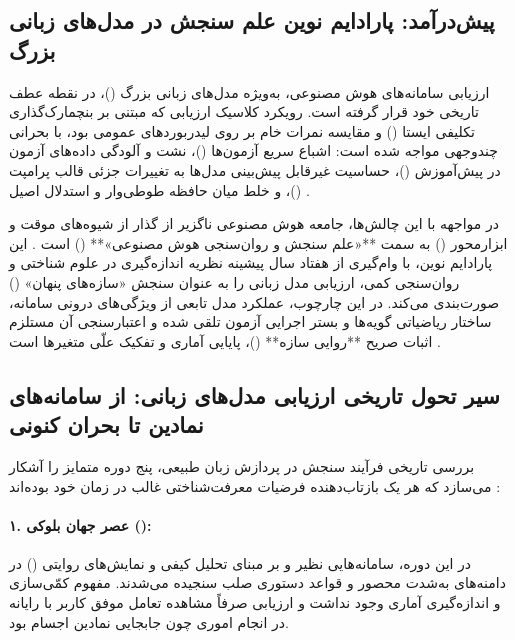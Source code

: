 \subsection*{پیش‌درآمد: پارادایم نوین علم سنجش در مدل‌های زبانی بزرگ}
ارزیابی سامانه‌های هوش مصنوعی، به‌ویژه مدل‌های زبانی بزرگ ()، در نقطه عطف تاریخی خود قرار گرفته است. رویکرد کلاسیک ارزیابی که مبتنی بر بنچمارک‌گذاری تکلیفی ایستا () و مقایسه نمرات خام بر روی لیدربوردهای عمومی بود، با بحرانی چندوجهی مواجه شده است: اشباع سریع آزمون‌ها ()، نشت و آلودگی داده‌های آزمون در پیش‌آموزش ()، حساسیت غیرقابل پیش‌بینی مدل‌ها به تغییرات جزئی قالب پرامپت ()، و خلط میان حافظه طوطی‌وار و استدلال اصیل \cite{bean2025measuring, uluirmak2026evalsafetygap, anonymous2026beyond}.

در مواجهه با این چالش‌ها، جامعه هوش مصنوعی ناگزیر از گذار از شیوه‌های موقت و ابزارمحور () به سمت **«علم سنجش و روان‌سنجی هوش مصنوعی»** () است \cite{zaghouani2026position, ye2025large, truong2026roadmap}. این پارادایم نوین، با وام‌گیری از هفتاد سال پیشینه نظریه اندازه‌گیری در علوم شناختی و روان‌سنجی کمی، ارزیابی مدل زبانی را به عنوان سنجش «سازه‌های پنهان» () صورت‌بندی می‌کند. در این چارچوب، عملکرد مدل تابعی از ویژگی‌های درونی سامانه، ساختار ریاضیاتی گویه‌ها و بستر اجرایی آزمون تلقی شده و اعتبارسنجی آن مستلزم اثبات صریح **روایی سازه** ()، پایایی آماری و تفکیک علّی متغیرها است \cite{salaudeen2025measurement, freiesleben2026establishing}.

\subsection*{سیر تحول تاریخی ارزیابی مدل‌های زبانی: از سامانه‌های نمادین تا بحران کنونی}
بررسی تاریخی فرآیند سنجش در پردازش زبان طبیعی، پنج دوره متمایز را آشکار می‌سازد که هر یک بازتاب‌دهنده فرضیات معرفت‌شناختی غالب در زمان خود بوده‌اند \cite{salaudeen2025measurement, bean2025measuring}:

\paragraph*{۱. عصر جهان بلوکی ():}
در این دوره، سامانه‌هایی نظیر  \cite{weizenbaum1966eliza} و  \cite{winograd1972understanding} بر مبنای تحلیل کیفی و نمایش‌های روایتی () در دامنه‌های به‌شدت محصور و قواعد دستوری صلب سنجیده می‌شدند. مفهوم کمّی‌سازی و اندازه‌گیری آماری وجود نداشت و ارزیابی صرفاً مشاهده تعامل موفق کاربر با رایانه در انجام اموری چون جابجایی نمادین اجسام بود.

